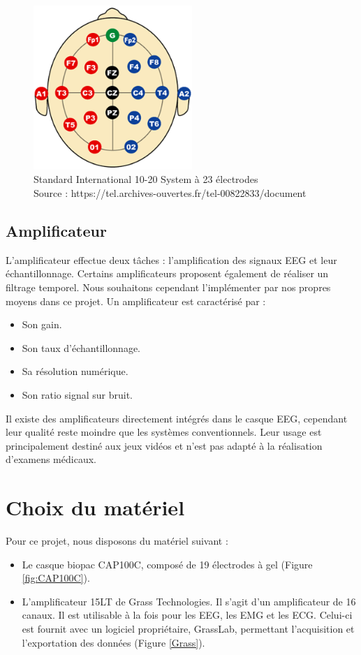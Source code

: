 \begin{figure}[h]
	\centering\includegraphics[width=6cm]{images/electrodesStandard.png}
	\caption[Standard International 10-20 System à 23 électrodes.]{Standard International 10-20 System à 23 électrodes\\Source : https://tel.archives-ouvertes.fr/tel-00822833/document}
	\label{fig:InternationalSystem}
\end{figure}

\subsection{Amplificateur}
\label{Subsection:3.Amplificateur}

L'amplificateur effectue deux tâches : l'amplification des signaux EEG et leur échantillonnage. Certains amplificateurs proposent également de réaliser un filtrage temporel. Nous souhaitons cependant l'implémenter par nos propres moyens dans ce projet. Un amplificateur est caractérisé par : 
\smallbreak
\begin{itemize}
	\item Son gain.
	\smallbreak
	\item Son taux d'échantillonnage.
	\smallbreak
	\item Sa résolution numérique.
	\smallbreak
	\item Son ratio signal sur bruit. 
\end{itemize}
\smallbreak
Il existe des amplificateurs directement intégrés dans le casque EEG, cependant leur qualité reste moindre que les systèmes conventionnels. Leur usage est principalement destiné aux jeux vidéos et n'est pas adapté à la réalisation d'examens médicaux. 

\section {Choix du matériel}
\label{Section:3.Choix du matériel}
Pour ce projet, nous disposons du matériel suivant :
\smallbreak
\begin{itemize}
	\item Le casque biopac CAP100C, composé de 19 électrodes à gel \cite{biopac} (Figure \ref{fig:CAP100C}).
	\smallbreak
	\item L'amplificateur 15LT de Grass Technologies. Il s'agit d'un amplificateur de 16 canaux. Il est utilisable à la fois pour les EEG, les EMG et les ECG. Celui-ci est fournit avec un logiciel propriétaire, GrassLab, permettant l'acquisition et l'exportation des données \cite{grass} (Figure \ref{Grass}).
\end{itemize}

